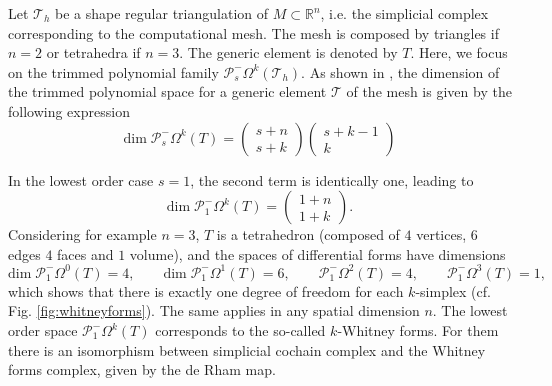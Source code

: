 \documentclass{elsarticle}
\newcommand{\bbR}{\mathbb{R}}
\begin{document}
Let $\mathcal{T}_h$ be a shape regular triangulation of $M \subset \bbR^n$, i.e. the simplicial complex corresponding to the computational mesh. The mesh is composed by triangles if $n=2$ or tetrahedra if $n=3$. The generic element is denoted by $T$. Here, we focus on the trimmed polynomial family $\mathcal{P}^-_s\Omega^k(\mathcal{T}_h)$. As shown in \cite{arnold2006acta}, the dimension of the trimmed polynomial space for a generic element 
$\mathcal{T}$
of the mesh is given by the following expression \begin{equation*}
\mathrm{dim}\; \mathcal{P}^-_s\Omega^k(T)=\begin{pmatrix}
s+n \\
s+k
\end{pmatrix}
\begin{pmatrix}
s+k-1 \\
k
\end{pmatrix}
\end{equation*}

In the lowest order case $s=1$, the second term is identically one, leading to 
\begin{equation*}
    \mathrm{dim}\; \mathcal{P}^-_1\Omega^k(T)=\begin{pmatrix}
1+n \\
1+k
\end{pmatrix}.
\end{equation*}
Considering for example $n=3$, $T$ is a tetrahedron (composed of $4$ vertices, $6$ edges $4$ faces and $1$ volume), and the spaces of differential forms have dimensions
\begin{equation*}
   \mathrm{dim}\; \mathcal{P}^-_1\Omega^0(T)= 4, \qquad \mathrm{dim}\; \mathcal{P}^-_1\Omega^1(T)= 6, \qquad \mathcal{P}^-_1\Omega^2(T)= 4, \qquad \mathcal{P}^-_1\Omega^3(T)= 1,
\end{equation*}
which shows that there is exactly one degree of freedom for each $k$-simplex (cf. Fig. \ref{fig:whitneyforms}). The same applies in any spatial dimension $n$. The lowest order space $\mathcal{P}^-_1\Omega^k(T)$ corresponds to the so-called $k$-Whitney forms. For them there is an isomorphism between simplicial cochain complex and the Whitney forms complex, given by the de Rham map. 
\end{document}

